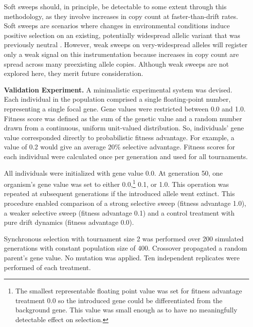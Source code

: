 Soft sweeps should, in principle, be detectable to some extent through this methodology, as they involve increases in copy count at faster-than-drift rates.
Soft sweeps are scenarios where changes in environmental conditions induce positive selection on an existing, potentially widespread allelic variant that was previously neutral \citep{hermisson2005soft}.
However, weak sweeps on very-widespread alleles will register only a weak signal on this instrumentation because increases in copy count are spread across many preexisting allele copies.
Although weak sweeps are not explored here, they merit future consideration.

\textbf{Validation Experiment.}
A minimalistic experimental system was devised.
Each individual in the population comprised a single floating-point number, representing a single focal gene.
Gene values were restricted between 0.0 and 1.0.
Fitness score was defined as the sum of the genetic value and a random number drawn from a continuous, uniform unit-valued distribution.
So, individuals' gene value corresponded directly to probabilistic fitness advantage.
For example, a value of 0.2 would give an average 20\% selective advantage.
Fitness scores for each individual were calculated once per generation and used for all tournaments.

All individuals were initialized with gene value 0.0.
At generation 50, one organism's gene value was set to either 0.0,\footnote{The smallest representable floating point value was set for fitness advantage treatment 0.0 so the introduced gene could be differentiated from the background gene.
This value was small enough as to have no meaningfully detectable effect on selection.} 0.1, or 1.0.
This operation was repeated at subsequent generations if the introduced allele went extinct.
This procedure enabled comparison of a strong selective sweep (fitness advantage 1.0), a weaker selective sweep (fitness advantage 0.1) and a control treatment with pure drift dynamics (fitness advantage 0.0).

Synchronous selection with tournament size 2 was performed over 200 simulated generations with constant population size of 400.
Crossover propagated a random parent's gene value.
No mutation was applied.
Ten independent replicates were performed of each treatment.
